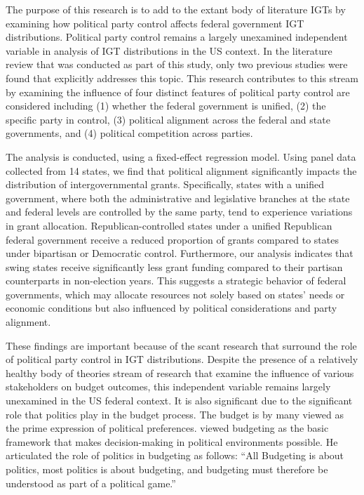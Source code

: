 The purpose of this research is to add to the extant body of literature IGTs by examining how political party control affects federal government IGT distributions. Political party control remains a largely unexamined independent variable in analysis of IGT distributions in the US context. In the literature review that was conducted as part of this study, only two previous studies were found that explicitly addresses this topic\parencite{ansolabehere2002equal,ansolabehere2006party}. This research contributes to this stream by examining the influence of four distinct features of political party control are considered including (1) whether the federal government is unified, (2) the specific party in control, (3) political alignment across the federal and state governments, and (4) political competition across parties.


The analysis is conducted, using a fixed-effect regression model. Using panel data collected from 14 states, we find that political alignment significantly impacts the distribution of intergovernmental grants. Specifically, states with a unified government, where both the administrative and legislative branches at the state and federal levels are controlled by the same party, tend to experience variations in grant allocation. Republican-controlled states under a unified Republican federal government receive a reduced proportion of grants compared to states under bipartisan or Democratic control. Furthermore, our analysis indicates that swing states receive significantly less grant funding compared to their partisan counterparts in non-election years. This suggests a strategic behavior of federal governments, which may allocate resources not solely based on states' needs or economic conditions but also influenced by political considerations and party alignment.

These findings are important because of the scant research that surround the role of political party control in IGT distributions. Despite the presence of a relatively healthy body of theories stream of research that examine the influence of various stakeholders on budget outcomes, this independent variable remains largely unexamined in the US federal context\parencite{patashnik2000budgeting}.  It is also significant due to the significant role that politics play in the budget process. The budget is by many viewed as the prime expression of political preferences. \textcite{wildavsky2003new} viewed budgeting as the basic framework that makes decision-making in political environments possible.  He articulated the role of politics in budgeting as follows: “All Budgeting is about politics, most politics is about budgeting, and budgeting must therefore be understood as part of a political game.”

